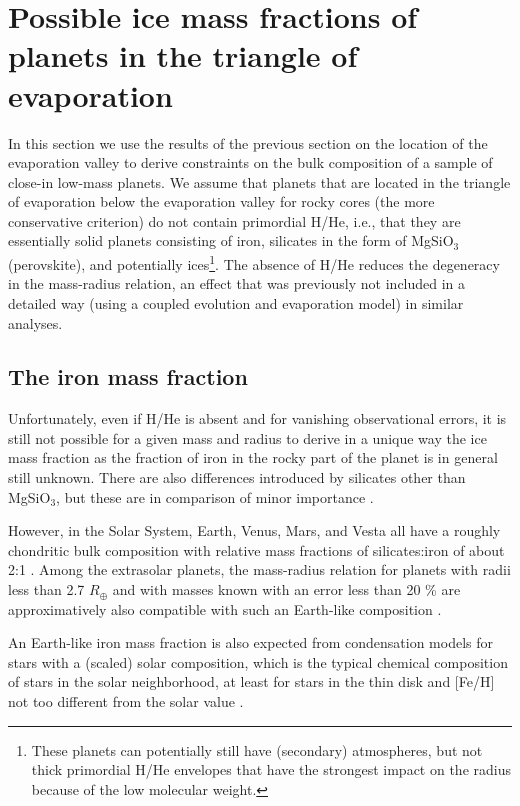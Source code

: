 \documentclass[]{emulateapj}
\def\rearth{R_{\oplus}}
\begin{document}
\section{Possible ice mass fractions of planets in the triangle of evaporation}\label{sect:icemassfraction}
In this section we use the results of the previous section on the location of the evaporation valley to derive constraints on the bulk composition of a sample of close-in low-mass planets.  We assume that planets that are located in the triangle of evaporation below the evaporation valley for rocky cores (the more conservative criterion) do not contain primordial H/He, i.e., that they are essentially solid planets consisting of iron, silicates in the form of  MgSiO$_{3}$ (perovskite), and potentially ices\footnote{These planets can potentially still have (secondary) atmospheres, but not thick primordial H/He envelopes that have the strongest impact on the radius because of the low molecular weight.}. The absence of H/He reduces the degeneracy in the mass-radius relation, an effect that was previously not included in a detailed way (using a coupled evolution and evaporation model) in similar analyses.

\subsection{{The iron mass fraction}}\label{subsect:ironmassfraction}
Unfortunately, even if H/He is absent and for vanishing observational errors, it is still not possible for a given mass and radius to derive in a unique way the ice mass fraction as the fraction of iron in the rocky part of the planet is in general still unknown. There are also differences introduced by silicates other than MgSiO$_{3}$, but these are in comparison of minor importance \citep[][hereafter SKHM07]{Seager2007}.  

However, in the Solar System, Earth, Venus, Mars, and Vesta all have a roughly chondritic bulk composition with relative mass fractions of silicates:iron of about 2:1 \citep[SKHM07,][]{AsphaugReufer2014}. Among the extrasolar planets, the mass-radius relation for planets with radii less than 2.7 $\rearth$ and with masses known with an error less than 20 \% are approximatively also compatible with such an Earth-like composition \citep{Dressing2015,Motalebi2015,Buchhave2016}.

An Earth-like iron mass fraction is also expected from condensation models for stars with a (scaled) solar composition, which is the typical chemical composition of stars in the solar neighborhood, at least for stars in the thin disk and [Fe/H] not too different from the solar value \citep{Santos2015}.
\end{document}
